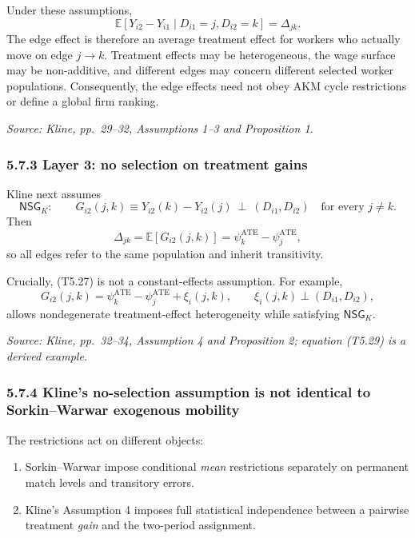 \documentclass[11pt]{article}
\begin{document}
Under these assumptions,
\[
\mathbb E[
Y_{i2}-Y_{i1}
\mid
D_{i1}=j,D_{i2}=k
]
=
\Delta_{jk}.
\tag{T5.26}
\]
The edge effect is therefore an average treatment effect for workers who
actually move on edge \(j\to k\).  Treatment effects may be heterogeneous,
the wage surface may be non-additive, and different edges may concern
different selected worker populations.  Consequently, the edge effects need
not obey AKM cycle restrictions or define a global firm ranking.

\textit{Source: Kline, pp.\ 29--32, Assumptions 1--3 and Proposition 1.}

\subsubsection{5.7.3 Layer 3: no selection on treatment gains}

Kline next assumes
\[
\mathsf{NSG}_{K}:
\qquad
G_{i2}(j,k)
\equiv
Y_{i2}(k)-Y_{i2}(j)
\ \perp\
(D_{i1},D_{i2})
\quad
\text{for every }j\neq k.
\tag{T5.27}
\]
Then
\[
\Delta_{jk}
=
\mathbb E[G_{i2}(j,k)]
=
\psi_k^{\mathrm{ATE}}-\psi_j^{\mathrm{ATE}},
\tag{T5.28}
\]
so all edges refer to the same population and inherit transitivity.

Crucially, (T5.27) is not a constant-effects assumption.  For example,
\[
G_{i2}(j,k)
=
\psi_k^{\mathrm{ATE}}-\psi_j^{\mathrm{ATE}}+\xi_i(j,k),
\qquad
\xi_i(j,k)\perp(D_{i1},D_{i2}),
\tag{T5.29}
\]
allows nondegenerate treatment-effect heterogeneity while satisfying
\(\mathsf{NSG}_{K}\).

\textit{Source: Kline, pp.\ 32--34, Assumption 4 and Proposition 2;
equation (T5.29) is a derived example.}

\subsubsection{5.7.4 Kline's no-selection assumption is not identical to
Sorkin--Warwar exogenous mobility}

The restrictions act on different objects:

\begin{enumerate}
\item Sorkin--Warwar impose conditional \emph{mean} restrictions separately
  on permanent match levels and transitory errors.
\item Kline's Assumption 4 imposes full statistical independence between a
  pairwise treatment \emph{gain} and the two-period assignment.
\end{enumerate}
\end{document}
